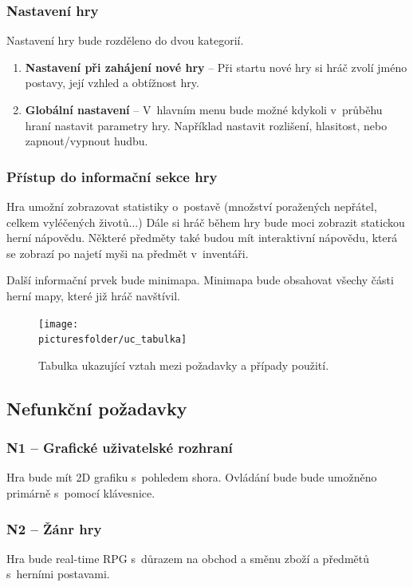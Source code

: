 \documentclass[12pt,a4paper]{article}
\def\picturesfolder{obrazky}
\begin{document}
\subsubsection{Nastavení hry}
Nastavení hry bude rozděleno do dvou kategorií.

\begin{enumerate}
  \item{\textbf{Nastavení při zahájení nové hry} -- Při startu nové hry si hráč
    zvolí jméno postavy, její vzhled a obtížnost hry.}
  \item{\textbf{Globální nastavení} -- V~hlavním menu bude možné kdykoli
v~průběhu hraní nastavit parametry hry. Například nastavit rozlišení,
    hlasitost, nebo zapnout/vypnout hudbu.}
\end{enumerate}

\subsubsection{Přístup do informační sekce hry}
Hra umožní zobrazovat statistiky o~postavě (množství poražených nepřátel,
celkem vyléčených životů$\dots$) Dále si hráč během hry bude moci zobrazit statickou
herní nápovědu. Některé předměty také budou mít interaktivní nápovědu, která se
zobrazí po najetí myši na předmět v~inventáři.  

Další informační prvek bude minimapa. Minimapa bude obsahovat všechy části herní
mapy, které již hráč navštívil.

\begin{figure}
\begin{center}
  \texttt{[image: \\picturesfolder/uc\_tabulka]}
  \caption{Tabulka ukazující vztah mezi požadavky a případy použití.}
  \label{uc:tabulka}
  \end{center}
\end{figure}

\subsection{Nefunkční požadavky}

\subsubsection{N1 --  Grafické uživatelské rozhraní  }
  Hra bude mít 2D grafiku s~pohledem shora. Ovládání bude bude umožněno
  primárně s~pomocí klávesnice.

\subsubsection{N2 -- Žánr hry}
  Hra bude real-time RPG s~důrazem na obchod a směnu zboží a předmětů s~herními
  postavami.
\end{document}
